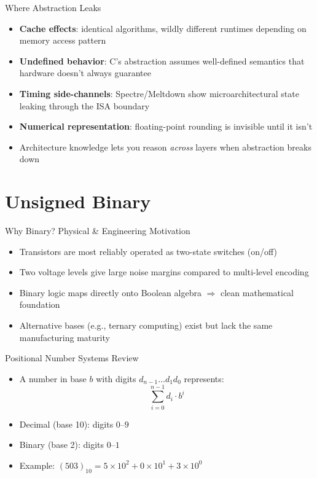 \documentclass[10pt, aspectratio=169]{beamer}
\begin{document}
\begin{frame}{Where Abstraction Leaks}
\begin{itemize}
    \item \textbf{Cache effects}: identical algorithms, wildly different runtimes depending on memory access pattern
    \item \textbf{Undefined behavior}: C's abstraction assumes well-defined semantics that hardware doesn't always guarantee
    \item \textbf{Timing side-channels}: Spectre/Meltdown show microarchitectural state leaking through the ISA boundary
    \item \textbf{Numerical representation}: floating-point rounding is invisible until it isn't
    \item Architecture knowledge lets you reason \emph{across} layers when abstraction breaks down
\end{itemize}
\end{frame}

\section{Unsigned Binary}

\begin{frame}{Why Binary? Physical \& Engineering Motivation}
\begin{itemize}
    \item Transistors are most reliably operated as two-state switches (on/off)
    \item Two voltage levels give large noise margins compared to multi-level encoding
    \item Binary logic maps directly onto Boolean algebra $\Rightarrow$ clean mathematical foundation
    \item Alternative bases (e.g., ternary computing) exist but lack the same manufacturing maturity
\end{itemize}
\end{frame}

\begin{frame}{Positional Number Systems Review}
\begin{itemize}
    \item A number in base $b$ with digits $d_{n-1} \ldots d_1 d_0$ represents:
    \[
    \sum_{i=0}^{n-1} d_i \cdot b^i
    \]
    \item Decimal (base 10): digits $0$--$9$
    \item Binary (base 2): digits $0$--$1$
    \item Example: $(503)_{10} = 5\times10^2 + 0\times10^1 + 3\times10^0$
\end{itemize}
\end{frame}
\end{document}
